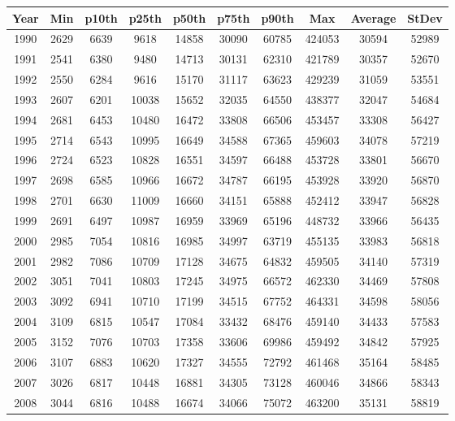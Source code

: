 \begin{table}[H]
\centering
\begin{tabular}{|c|ccccccccc|}
  \hline
Year & Min & p10th & p25th & p50th & p75th & p90th & Max & Average & StDev \\ 
  \hline
1990 & 2629 & 6639 & 9618 & 14858 & 30090 & 60785 & 424053 & 30594 & 52989 \\ 
  1991 & 2541 & 6380 & 9480 & 14713 & 30131 & 62310 & 421789 & 30357 & 52670 \\ 
  1992 & 2550 & 6284 & 9616 & 15170 & 31117 & 63623 & 429239 & 31059 & 53551 \\ 
  1993 & 2607 & 6201 & 10038 & 15652 & 32035 & 64550 & 438377 & 32047 & 54684 \\ 
  1994 & 2681 & 6453 & 10480 & 16472 & 33808 & 66506 & 453457 & 33308 & 56427 \\ 
  1995 & 2714 & 6543 & 10995 & 16649 & 34588 & 67365 & 459603 & 34078 & 57219 \\ 
  1996 & 2724 & 6523 & 10828 & 16551 & 34597 & 66488 & 453728 & 33801 & 56670 \\ 
  1997 & 2698 & 6585 & 10966 & 16672 & 34787 & 66195 & 453928 & 33920 & 56870 \\ 
  1998 & 2701 & 6630 & 11009 & 16660 & 34151 & 65888 & 452412 & 33947 & 56828 \\ 
  1999 & 2691 & 6497 & 10987 & 16959 & 33969 & 65196 & 448732 & 33966 & 56435 \\ 
  2000 & 2985 & 7054 & 10816 & 16985 & 34997 & 63719 & 455135 & 33983 & 56818 \\ 
  2001 & 2982 & 7086 & 10709 & 17128 & 34675 & 64832 & 459505 & 34140 & 57319 \\ 
  2002 & 3051 & 7041 & 10803 & 17245 & 34975 & 66572 & 462330 & 34469 & 57808 \\ 
  2003 & 3092 & 6941 & 10710 & 17199 & 34515 & 67752 & 464331 & 34598 & 58056 \\ 
  2004 & 3109 & 6815 & 10547 & 17084 & 33432 & 68476 & 459140 & 34433 & 57583 \\ 
  2005 & 3152 & 7076 & 10703 & 17358 & 33606 & 69986 & 459492 & 34842 & 57925 \\ 
  2006 & 3107 & 6883 & 10620 & 17327 & 34555 & 72792 & 461468 & 35164 & 58485 \\ 
  2007 & 3026 & 6817 & 10448 & 16881 & 34305 & 73128 & 460046 & 34866 & 58343 \\ 
  2008 & 3044 & 6816 & 10488 & 16674 & 34066 & 75072 & 463200 & 35131 & 58819 \\ 

\end{tabular}
\end{table}
